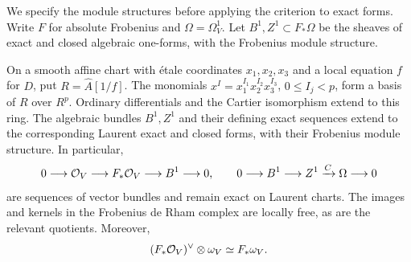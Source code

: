 We specify the module structures before applying the criterion to
exact forms.  Write $F$ for absolute Frobenius and
$\Omega=\Omega_V^1$.  Let $B^1,Z^1\subset F_*\Omega$ be the
sheaves of exact and closed algebraic one-forms, with the
Frobenius module structure.

\begin{lemma}\label{lem:laurent-cartier-algebra}
On a smooth affine chart with \'{e}tale coordinates $x_1,x_2,x_3$
and a local equation $f$ for $D$, put
$R=\widehat A[1/f]$.  The monomials
$x^I=x_1^{I_1}x_2^{I_2}x_3^{I_3}$, $0\le I_j<p$, form a basis
of $R$ over $R^p$.  Ordinary differentials and the Cartier
isomorphism extend to this ring.  The algebraic bundles $B^1,Z^1$
and their defining exact sequences extend to the corresponding
Laurent exact and closed forms, with their Frobenius module structure.
In particular,
\begin{equation}\label{eq:cartier-sequences}
 0\longrightarrow\mathcal O_V\longrightarrow F_*\mathcal O_V
   \longrightarrow B^1\longrightarrow0,
 \qquad
 0\longrightarrow B^1\longrightarrow Z^1
   \xrightarrow{C}\Omega\longrightarrow0
\end{equation}
are sequences of vector bundles and remain exact on Laurent charts.
The images and kernels in the Frobenius de Rham complex are locally
free, as are the relevant quotients.  Moreover,
\begin{equation}\label{eq:frobenius-duality}
 (F_*\mathcal O_V)^\vee\otimes\omega_V\simeq F_*\omega_V.
\end{equation}
\end{lemma}

